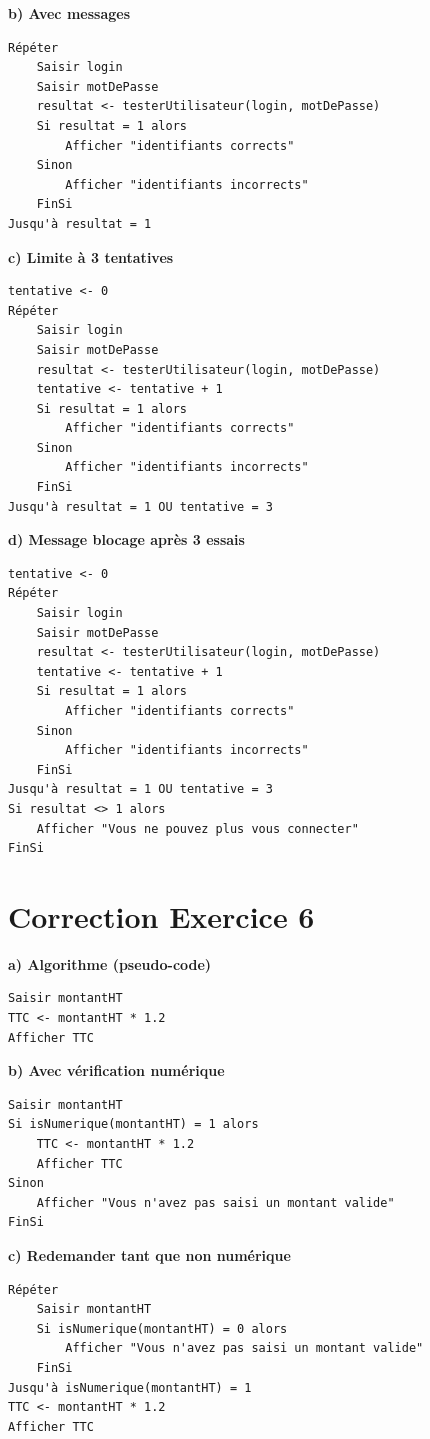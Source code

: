 \documentclass[12pt,a4paper]{article}
\begin{document}
\textbf{b) Avec messages}
\begin{verbatim}
Répéter
    Saisir login
    Saisir motDePasse
    resultat <- testerUtilisateur(login, motDePasse)
    Si resultat = 1 alors
        Afficher "identifiants corrects"
    Sinon
        Afficher "identifiants incorrects"
    FinSi
Jusqu'à resultat = 1
\end{verbatim}

\textbf{c) Limite à 3 tentatives}
\begin{verbatim}
tentative <- 0
Répéter
    Saisir login
    Saisir motDePasse
    resultat <- testerUtilisateur(login, motDePasse)
    tentative <- tentative + 1
    Si resultat = 1 alors
        Afficher "identifiants corrects"
    Sinon
        Afficher "identifiants incorrects"
    FinSi
Jusqu'à resultat = 1 OU tentative = 3
\end{verbatim}

\textbf{d) Message blocage après 3 essais}
\begin{verbatim}
tentative <- 0
Répéter
    Saisir login
    Saisir motDePasse
    resultat <- testerUtilisateur(login, motDePasse)
    tentative <- tentative + 1
    Si resultat = 1 alors
        Afficher "identifiants corrects"
    Sinon
        Afficher "identifiants incorrects"
    FinSi
Jusqu'à resultat = 1 OU tentative = 3
Si resultat <> 1 alors
    Afficher "Vous ne pouvez plus vous connecter"
FinSi
\end{verbatim}

\section*{Correction Exercice 6}
\textbf{a) Algorithme (pseudo-code)}
\begin{verbatim}
Saisir montantHT
TTC <- montantHT * 1.2
Afficher TTC
\end{verbatim}

\textbf{b) Avec vérification numérique}
\begin{verbatim}
Saisir montantHT
Si isNumerique(montantHT) = 1 alors
    TTC <- montantHT * 1.2
    Afficher TTC
Sinon
    Afficher "Vous n'avez pas saisi un montant valide"
FinSi
\end{verbatim}

\textbf{c) Redemander tant que non numérique}
\begin{verbatim}
Répéter
    Saisir montantHT
    Si isNumerique(montantHT) = 0 alors
        Afficher "Vous n'avez pas saisi un montant valide"
    FinSi
Jusqu'à isNumerique(montantHT) = 1
TTC <- montantHT * 1.2
Afficher TTC
\end{verbatim}
\end{document}
